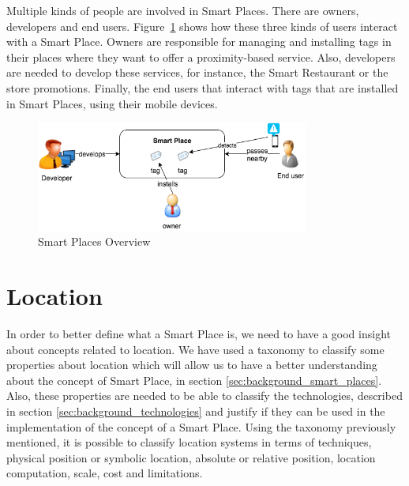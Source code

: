 Multiple kinds of people are involved in Smart Places.
There are owners, developers and end users.
Figure~\ref{fig:smart_places_overview} shows how these three kinds of users interact with a Smart Place.
Owners are responsible for managing and installing tags in their places where they want to offer a proximity-based service.
Also, developers are needed to develop these services, for instance, the Smart Restaurant or the store promotions.
Finally, the end users that interact with tags that are installed in Smart Places, using their mobile devices.

\begin{figure}[!ht]
  \centering
    \includegraphics[width=0.8\textwidth, keepaspectratio]{images/smart_places_overview}
    \caption[Smart Places Overview]{Smart Places Overview}
    \label{fig:smart_places_overview}
\end{figure}

\section{Location}
\label{sec:background_location}
In order to better define what a Smart Place is, we need to have a good insight about concepts related to location.
We have used a taxonomy\cite{location} to classify some properties about location which will allow us to have a better understanding about the concept of Smart Place, in section \ref{sec:background_smart_places}.
Also, these properties are needed to be able to classify the technologies, described in section \ref{sec:background_technologies} and justify if they can be used in the implementation of the concept of a Smart Place.
Using the taxonomy previously mentioned, it is possible to classify location systems in terms of techniques, physical position or symbolic location, absolute or relative position, location computation, scale, cost and limitations.

